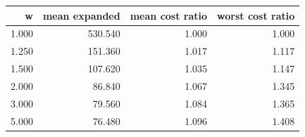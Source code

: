 \begin{tabular}{rrrr}
\toprule
w & mean expanded & mean cost ratio & worst cost ratio \\
\midrule
1.000 & 530.540 & 1.000 & 1.000 \\
1.250 & 151.360 & 1.017 & 1.117 \\
1.500 & 107.620 & 1.035 & 1.147 \\
2.000 & 86.840 & 1.067 & 1.345 \\
3.000 & 79.560 & 1.084 & 1.365 \\
5.000 & 76.480 & 1.096 & 1.408 \\
\bottomrule
\end{tabular}
